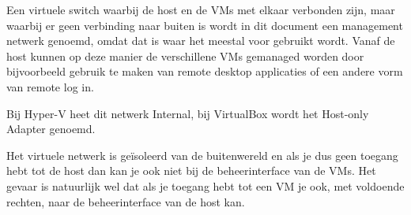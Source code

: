 Een virtuele switch waarbij de host en de VMs met elkaar verbonden zijn, maar waarbij er geen verbinding naar buiten is wordt in dit document een management netwerk genoemd, omdat dat is waar het meestal voor gebruikt wordt. Vanaf de host kunnen op deze manier de verschillene VMs gemanaged worden door bijvoorbeeld gebruik te maken van remote desktop applicaties of een andere vorm van remote log
in.

Bij Hyper-V heet dit netwerk Internal, bij VirtualBox wordt het Host-only Adapter genoemd.

Het virtuele netwerk is ge\"isoleerd van de buitenwereld en als je dus geen toegang hebt tot de host dan kan je ook niet bij de beheerinterface van de VMs. Het gevaar is natuurlijk wel dat als je toegang hebt tot een VM je ook, met voldoende rechten, naar de beheerinterface van de host kan.
